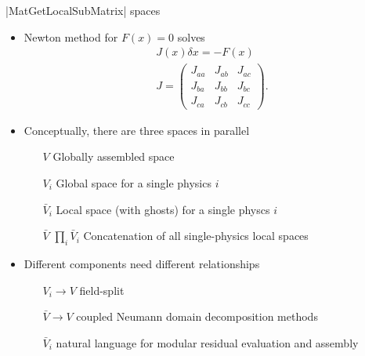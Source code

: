 \begin{frame}[fragile]{\cfunc|MatGetLocalSubMatrix| spaces}
  \begin{itemize}
  \item Newton method for $F(x) = 0$ solves
    \begin{gather*}
      J(x) \delta x = - F(x) \\
      J = \begin{pmatrix}
      J_{aa} & J_{ab} & J_{ac} \\
      J_{ba} & J_{bb} & J_{bc} \\
      J_{ca} & J_{cb} & J_{cc}
    \end{pmatrix} .
    \end{gather*}
  \item Conceptually, there are three spaces in parallel
    \begin{itemize}
    \item[$V$] Globally assembled space
    \item[$V_i$] Global space for a single physics $i$
    \item[$\bar V_i$] Local space (with ghosts) for a single physcs $i$
    \item[$\bar V$] $\prod_i \bar V_i$ Concatenation of all single-physics local spaces
    \end{itemize}
  \item Different components need different relationships
    \begin{itemize}
    \item[$V_i \to V$] field-split
    \item[$\bar V \to V$] coupled Neumann domain decomposition methods
    \item[$\bar V_i$] natural language for modular residual evaluation and assembly
    \end{itemize}
  \end{itemize}
\end{frame}

